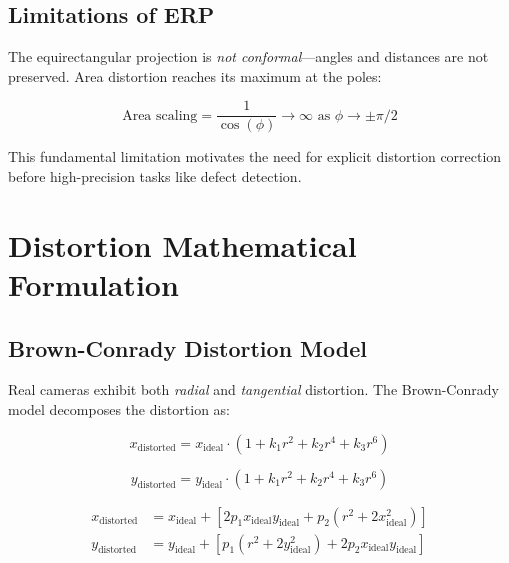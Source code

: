 \documentclass[11pt,a4paper,oneside]{article}
\begin{document}
\subsection{Limitations of ERP}

The equirectangular projection is \textit{not conformal}—angles and distances are not preserved. Area distortion reaches its maximum at the poles:

\begin{equation}
\text{Area scaling} = \frac{1}{\cos(\phi)} \rightarrow \infty \text{ as } \phi \to \pm\pi/2
\label{eq:area_distortion}
\end{equation}

This fundamental limitation motivates the need for explicit distortion correction before high-precision tasks like defect detection.


\section{Distortion Mathematical Formulation}
\label{sec:distortion}

\subsection{Brown-Conrady Distortion Model}

Real cameras exhibit both \textit{radial} and \textit{tangential} distortion. The Brown-Conrady model \cite{brown1971close} decomposes the distortion as:

\begin{equation}
x_{\text{distorted}} = x_{\text{ideal}} \cdot (1 + k_1 r^2 + k_2 r^4 + k_3 r^6)
\label{eq:radial}
\end{equation}

\begin{equation}
y_{\text{distorted}} = y_{\text{ideal}} \cdot (1 + k_1 r^2 + k_2 r^4 + k_3 r^6)
\label{eq:radial_y}
\end{equation}

\begin{align}
x_{\text{distorted}} &= x_{\text{ideal}} + [2p_1 x_{\text{ideal}} y_{\text{ideal}} + p_2(r^2 + 2x_{\text{ideal}}^2)] \label{eq:tangential} \\
y_{\text{distorted}} &= y_{\text{ideal}} + [p_1(r^2 + 2y_{\text{ideal}}^2) + 2p_2 x_{\text{ideal}} y_{\text{ideal}}]
\label{eq:tangential_y}
\end{align}
\end{document}
